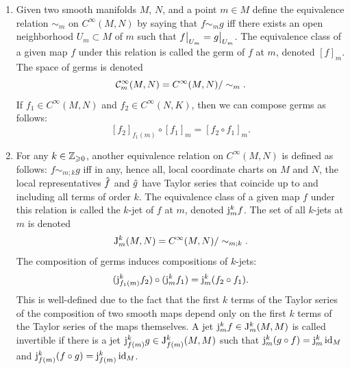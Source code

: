 \begin{defn}\label{def jet bundles}
    \begin{enumerate}
        \item Given two smooth manifolds $M$, $N$, and a point $m\in M$ define the equivalence relation $\sim_m$ on $C^\infty(M,N)$ by saying that $f\sim_m g$ iff there exists an open neighborhood $U_m\subset M$ of $m$ such that $\restr{f}{U_m}=\restr{g}{U_m}$. The equivalence class of a given map $f$ under this relation is called the germ of $f$ at $m$, denoted $[f]_m$. The space of germs is denoted
        \[\mathcal{C}^\infty_m(M,N)=C^\infty(M,N)\slash \sim_m.\]
        If $f_1\in C^\infty(M,N)$ and $f_2\in C^\infty(N,K)$, then we can compose germs as follows:
        \[[f_2]_{f_1(m)}\circ [f_1]_{m}=[f_2\circ f_1]_m.\]
        \item For any $k\in\mathbb{Z}_{\geqslant 0}$, another equivalence relation on $C^\infty(M,N)$ is defined as follows: $f\sim_{m;k}g$ iff in any, hence all, local coordinate charts on $M$ and $N$, the local representatives $\wh{f}$ and $\wh{g}$ have Taylor series that coincide up to and including all terms of order $k$. The equivalence class of a given map $f$ under this relation is called the $k$-jet of $f$ at $m$, denoted $\mathrm{j}_m^k f$. The set of all $k$-jets at $m$ is denoted
        \[\mathrm{J}_m^k(M,N)=C^\infty (M,N)\slash \sim_{m;k}.\]
        The composition of germs induces compositions of $k$-jets:
        \[(\mathrm{j}_{f_1(m)}^kf_2)\circ (\mathrm{j}_m^k f_1)=\mathrm{j}_m^k(f_2\circ f_1).\]
        This is well-defined due to the fact that the first $k$ terms of the Taylor series of the composition of two smooth maps depend only on the first $k$ terms of the Taylor series of the maps themselves.
        A jet $\mathrm{j}_m^kf\in \mathrm{J}^k_m(M,M)$ is called invertible if there is a jet $\mathrm{j}^k_{f(m)}g\in \mathrm{J}^k_{f(m)}(M,M)$ such that $\mathrm{j}^k_m(g\circ f)=\mathrm{j}^k_m\operatorname{id}_M$ and $\mathrm{j}^k_{f(m)}(f\circ g)=\mathrm{j}^k_{f(m)}\operatorname{id}_M$. 
        

\end{enumerate}
\end{defn}
